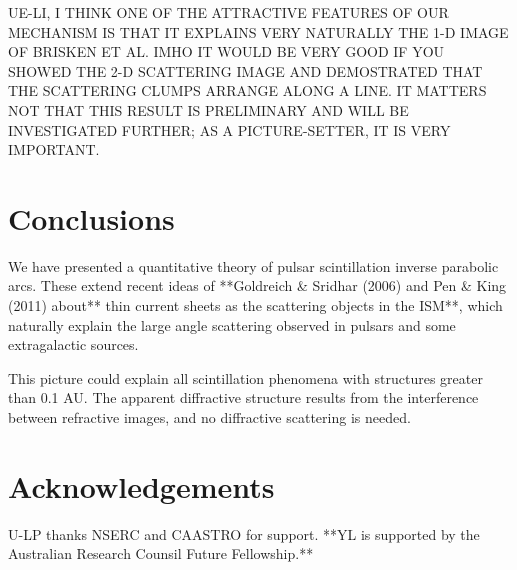 \documentclass[useAMS,usenatbib]{mn2e}
\begin{document}
UE-LI, I THINK ONE OF THE ATTRACTIVE FEATURES OF OUR MECHANISM IS THAT IT EXPLAINS VERY NATURALLY THE 1-D IMAGE OF BRISKEN ET AL. IMHO IT WOULD BE VERY GOOD IF YOU SHOWED
THE 2-D SCATTERING IMAGE AND DEMOSTRATED THAT THE SCATTERING CLUMPS ARRANGE ALONG A 
LINE. IT MATTERS NOT THAT THIS RESULT IS PRELIMINARY AND WILL BE INVESTIGATED FURTHER;
AS A PICTURE-SETTER, IT IS VERY IMPORTANT.

\section{Conclusions}

We have presented a quantitative theory of pulsar scintillation
inverse parabolic arcs.  These extend recent ideas of **Goldreich \& Sridhar (2006) and
Pen \& King (2011) about** thin current
sheets as the scattering objects in the ISM**, which naturally explain the large angle 
scattering observed in
pulsars and some extragalactic sources.

This picture could explain all scintillation phenomena with structures
greater than 0.1 AU.  The apparent diffractive structure results from
the interference between refractive images, and no diffractive
scattering is needed.

\section{Acknowledgements}

U-LP thanks NSERC and CAASTRO for support. **YL is supported 
by the Australian Research Counsil Future Fellowship.**


\newcommand{\araa}{ARA\&A}   %
\newcommand{\afz}{Afz}       %
\newcommand{\aj}{AJ}         %
\newcommand{\azh}{AZh}       %
\newcommand{\aaa}{A\&A}      %
\newcommand{\aas}{A\&AS}     %
\newcommand{\aar}{A\&AR}     %
\newcommand{\apj}{ApJ}       %
\newcommand{\apjs}{ApJS}     %
\newcommand{\apjl}{ApJ}      %
\newcommand{\apss}{Ap\&SS}   %
\newcommand{\baas}{BAAS}     %
\newcommand{\jaa}{JA\&A}     %
\newcommand{\mnras}{MNRAS}   %
\newcommand{\nat}{Nat}       %
\newcommand{\pasj}{PASJ}     %
\newcommand{\pasp}{PASP}     %
\newcommand{\paspc}{PASPC}   %
\newcommand{\qjras}{QJRAS}   %
\newcommand{\sci}{Sci}       %
\newcommand{\solphys}{Solar Physics}       %
\newcommand{\sova}{SvA}      %
\newcommand{\aap}{A\&A}






\label{lastpage}
\end{document}
